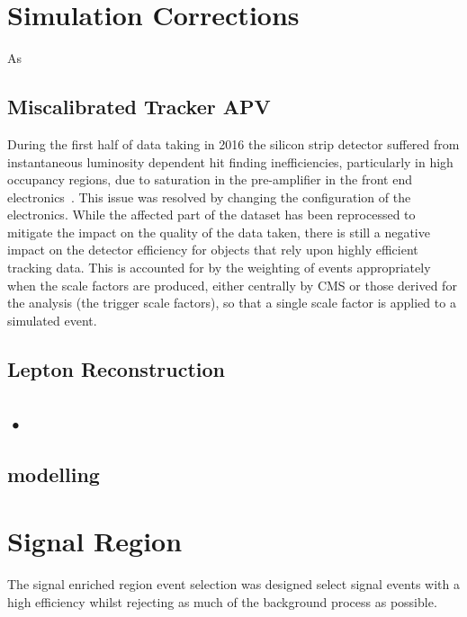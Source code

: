 \section{Simulation Corrections}\label{sec:simCorrections}
As 

\subsection{Miscalibrated Tracker APV}
During the first half of data taking in 2016 the silicon strip detector suffered from instantaneous luminosity dependent  hit finding inefficiencies, particularly in high occupancy regions, due to saturation in the pre-amplifier in the front end electronics~\cite{Fiori:2016ebh}.
This issue was resolved by changing the configuration of the electronics.
While the affected part of the dataset has been reprocessed to mitigate the impact on the quality of the data taken, there is still a negative impact on the detector efficiency for objects that rely upon highly efficient tracking data.
This is accounted for by the weighting of events appropriately when the scale factors are produced, either centrally by CMS or those derived for the analysis (\ie the trigger scale factors), so that a single scale factor is applied to a simulated event.


\subsection{Lepton Reconstruction}\label{subsec:leptonRecoSFs}
\subsection{•}
\subsection{\PU modelling}

\section{Signal Region}\label{sec:signalRegion}
The signal enriched region event selection was designed select signal events with a high efficiency whilst rejecting as much of the background process as possible.

